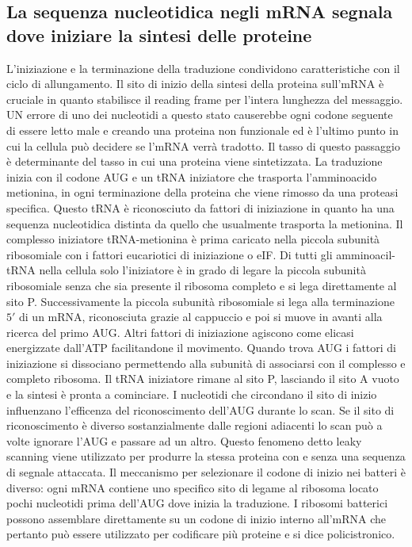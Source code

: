 \subsection{La sequenza nucleotidica negli mRNA segnala dove iniziare la sintesi delle proteine}
L'iniziazione e la terminazione della traduzione condividono caratteristiche con il ciclo di allungamento. Il sito di inizio della sintesi della proteina sull'mRNA \`e cruciale in quanto
stabilisce il reading frame per l'intera lunghezza del messaggio. UN errore di uno dei nucleotidi a questo stato causerebbe ogni codone seguente di essere letto male e creando una 
proteina non funzionale ed \`e l'ultimo punto in cui la cellula pu\`o decidere se l'mRNA verr\`a tradotto. Il tasso di questo passaggio \`e determinante del tasso in cui una proteina 
viene sintetizzata. La traduzione inizia con il codone AUG e un tRNA iniziatore che trasporta l'amminoacido metionina, in ogni terminazione  della proteina che viene rimosso
da una proteasi specifica. Questo tRNA \`e riconosciuto da fattori di iniziazione in quanto ha una sequenza nucleotidica distinta da quello che usualmente trasporta la metionina. Il
complesso iniziatore tRNA-metionina \`e prima caricato nella piccola subunit\`a ribosomiale con i fattori eucariotici di iniziazione o eIF. Di tutti gli amminoacil-tRNA nella cellula 
solo l'iniziatore \`e in grado di legare la piccola subunit\`a ribosomiale senza che sia presente il ribosoma completo e si lega direttamente al sito P. Successivamente la piccola 
subunit\`a ribosomiale si lega alla terminazione $5'$ di un mRNA, riconosciuta grazie al cappuccio e poi si muove in avanti alla ricerca del primo AUG. Altri fattori di iniziazione 
agiscono come elicasi energizzate dall'ATP facilitandone il movimento. Quando trova AUG i fattori di iniziazione si dissociano permettendo alla subunit\`a di associarsi con il
complesso e completo ribosoma. Il tRNA iniziatore rimane al sito P, lasciando il sito A vuoto e la sintesi \`e pronta a cominciare. I nucleotidi che circondano il sito di inizio 
influenzano l'efficenza del riconoscimento dell'AUG durante lo scan. Se il sito di riconoscimento \`e diverso sostanzialmente dalle regioni adiacenti lo scan pu\`o a volte ignorare l'AUG
e passare ad un altro. Questo fenomeno detto leaky scanning viene utilizzato per produrre la stessa proteina con e senza una sequenza di segnale attaccata. Il meccanismo per selezionare 
il codone di inizio nei batteri \`e diverso: ogni mRNA contiene uno specifico sito di legame al ribosoma locato pochi nucleotidi prima dell'AUG dove inizia la traduzione. I ribosomi 
batterici possono assemblare direttamente su un codone di inizio interno all'mRNA che pertanto pu\`o essere utilizzato per codificare pi\`u proteine e si dice policistronico. 
